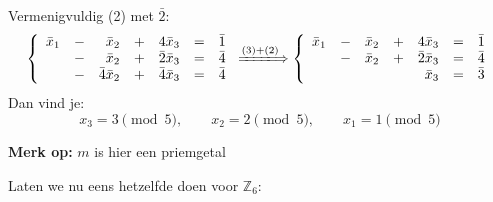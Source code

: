 Vermenigvuldig (2) met $\bar{2}$:
\begin{equation*}
\left\{
\begin{array}{rcrcrcl}
     \bar{x}_1 & - & \bar{x}_2 & + & 4\bar{x}_3 & = & \bar{1} \\
               & - & \bar{x}_2 & + & \bar{2}\bar{x}_3 & = & \bar{4} \\
               & - & \bar{4}\bar{x}_2 & + & \bar{4}\bar{x}_3 & = & \bar{4}
\end{array}
\right.
\xLongrightarrow{(3) + (2)}
\left\{
\begin{array}{rcrcrcl}
     \bar{x}_1 & - & \bar{x}_2 & + & 4\bar{x}_3       & = & \bar{1} \\
               & - & \bar{x}_2 & + & \bar{2}\bar{x}_3 & = & \bar{4} \\
               &   &           &   & \bar{x}_3        & = & \bar{3}
\end{array}
\right.  
\end{equation*}
Dan vind je:
\begin{equation*}
    x_3 = 3 \pmod{5}, \qquad x_2 = 2 \pmod{5}, \qquad x_1 = 1 \pmod{5}     
\end{equation*}

\begin{barbox}[red!66][red!1]
     \textbf{Merk op:} $m$ is hier een priemgetal
\end{barbox}

Laten we nu eens hetzelfde doen voor $\mathbb{Z}_6$:


